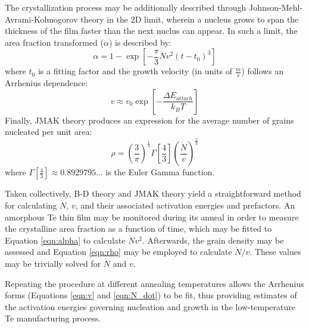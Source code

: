 The crystallization process may be additionally described through Johnson-Mehl-Avrami-Kolmogorov theory in the 2D limit, wherein a nucleus grows to span the thickness of the film faster than the next nuclus can appear.  In such a limit, the area fraction transformed ($\alpha$) is described by:
%
	\begin{equation}
		\alpha = 1 - \exp
		\left[ -\frac{\pi}{3}\dot{N}v^2(t - t_0)^3 \right]
	\label{eqn:alpha}
	\end{equation}
%
where $t_0$ is a fitting factor and the growth velocity (in units of $\frac{m}{s}$) follows an Arrhenius dependence:
%
	\begin{equation}
		v \approx v_0 \exp \left[ - \frac{\Delta E_{attach}}{k_B T} \right]
	\label{eqn:v}
	\end{equation}
%
Finally, JMAK theory produces an expression for the average number of grains nucleated per unit area:
%
	\begin{equation}
		\rho = \left(\frac{3}{\pi}\right)^{\frac{1}{3}}
		\Gamma \left[ \frac{4}{3} \right]
		\left( \frac{\dot{N}}{v} \right)^{\frac{2}{3}}
	\label{eqn:rho}
	\end{equation}
%
where $\Gamma \left[ \frac{4}{3} \right] \approx 0.8929795...$ is the Euler Gamma function.

Taken collectively, B-D theory and JMAK theory yield a straightforward method for calculating $\dot{N}$, $v$, and their associated activation energies and prefactors.  An amorphous Te thin film may be monitored during its anneal in order to measure the crystalline area fraction as a function of time, which may be fitted to Equation \ref{eqn:alpha} to calculate $\dot{N}v^2$.  Afterwards, the grain density may be assessed and Equation \ref{eqn:rho} may be employed to calculate $\dot{N}/v$.  These values may be trivially solved for $\dot{N}$ and ${v}$.

Repeating the procedure at different annealing temperatures allows the Arrhenius forms (Equations \ref{eqn:v} and \ref{eqn:N_dot}) to be fit, thus providing estimates of the activation energies governing nucleation and growth in the low-temperature Te manufacturing process.
